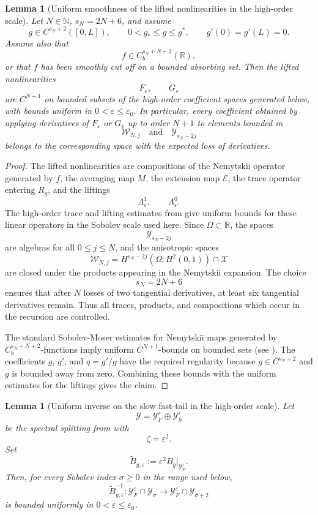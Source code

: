 \documentclass[11pt]{article}
\newtheorem{lemma}[theorem]{Lemma}
\theoremstyle{definition}
\theoremstyle{remark}
\numberwithin{equation}{section}
\begin{document}
\begin{lemma}[Uniform smoothness of the lifted nonlinearities in the high-order scale]
\label{lem:thin-domain-uniform-smoothness}
Let \(N\in\mathbb N\), \(s_N=2N+6\), and assume
\[
g\in C^{s_N+2}([0,L]),
\qquad
0<g_*\le g\le g^*,
\qquad
g'(0)=g'(L)=0.
\]
Assume also that
\[
f\in C_b^{s_N+N+2}(\mathbb R),
\]
or that \(f\) has been smoothly cut off on a bounded absorbing set. Then the
lifted nonlinearities
\[
F_\varepsilon,
\qquad
G_\varepsilon
\]
are \(C^{N+1}\) on bounded subsets of the high-order coefficient spaces
generated below, with bounds uniform in
\(0<\varepsilon\le\varepsilon_0\). In particular, every coefficient obtained by
applying derivatives of \(F_\varepsilon\) or \(G_\varepsilon\) up to order
\(N+1\) to elements bounded in
\[
\mathcal W_{N,j}
\quad\text{and}\quad
\mathcal Y_{s_N-2j}
\]
belongs to the corresponding space with the expected loss of derivatives.
\end{lemma}

\begin{proof}
The lifted nonlinearities are compositions of the Nemytskii operator generated
by \(f\), the averaging map \(M\), the extension map \(\mathcal E\), the trace
operator entering \(R_g\), and the liftings
\[
\Lambda_\varepsilon^1,
\qquad
\Lambda_\varepsilon^0.
\]
The high-order trace and lifting estimates from
 give uniform bounds for these linear
operators in the Sobolev scale used here. Since \(\Omega\subset\mathbb R\),
the spaces
\[
\mathcal Y_{s_N-2j}
\]
are algebras for all \(0\le j\le N\), and the anisotropic spaces
\[
\mathcal W_{N,j}
=
H^{s_N-2j}(\Omega;H^2(0,1))\cap\mathcal X
\]
are closed under the products appearing in the Nemytskii expansion. The choice
\[
s_N=2N+6
\]
ensures that after \(N\) losses of two tangential derivatives, at least six
tangential derivatives remain. Thus all traces, products, and compositions
which occur in the recursion are controlled.

The standard Sobolev-Moser estimates for Nemytskii maps generated by
\(C_b^{s_N+N+2}\)-functions imply uniform \(C^{N+1}\)-bounds on bounded sets (see \cite{han1997elliptic}).
The coefficients \(g\), \(g'\), and \(q=g'/g\) have the required regularity
because \(g\in C^{s_N+2}\) and \(g\) is bounded away from zero. Combining these
bounds with the uniform estimates for the liftings gives the claim.
\end{proof}

\begin{lemma}[Uniform inverse on the slow fast-tail in the high-order scale]
\label{lem:uniform-slow-tail-inverse-high}
Let
\[
\mathcal Y=\mathcal Y_F^\varepsilon\oplus\mathcal Y_S^\varepsilon
\]
be the spectral splitting from  with
\[
\zeta=\varepsilon^2.
\]
Set
\[
\widetilde B_{g,\varepsilon}
:=
\varepsilon^2B_g|_{\mathcal Y_F^\varepsilon}.
\]
Then, for every Sobolev index \(\sigma\ge0\) in the range used below,
\[
\widetilde B_{g,\varepsilon}^{-1}:
\mathcal Y_F^\varepsilon\cap\mathcal Y_\sigma
\to
\mathcal Y_F^\varepsilon\cap\mathcal Y_{\sigma+2}
\]
is bounded uniformly in \(0<\varepsilon\le\varepsilon_0\).
\end{lemma}
\end{document}
